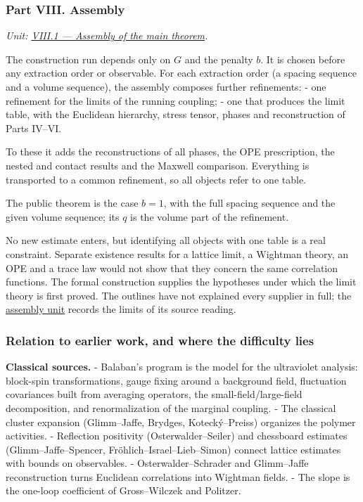 \documentclass[
  letterpaper,
  11pt]{article}
\begin{document}
\subsubsection{Part VIII. Assembly}\label{part-viii.-assembly}

\emph{Unit:
\href{https://github.com/scottnarmstrong/yang-mills-informalization/blob/main/outline/units/VIII-1.md}{VIII.1
--- Assembly of the main theorem}.}

The construction run depends only on \(G\) and the penalty \(b\). It is
chosen before any extraction order or observable. For each extraction
order (a spacing sequence and a volume sequence), the assembly composes
further refinements: - one refinement for the limits of the running
coupling; - one that produces the limit table, with the Euclidean
hierarchy, stress tensor, phases and reconstruction of Parts IV--VI.

To these it adds the reconstructions of all phases, the OPE
prescription, the nested and contact results and the Maxwell comparison.
Everything is transported to a common refinement, so all objects refer
to one table.

The public theorem is the case \(b=1\), with the full spacing sequence
and the given volume sequence; its \(q\) is the volume part of the
refinement.

No new estimate enters, but identifying all objects with one table is a
real constraint. Separate existence results for a lattice limit, a
Wightman theory, an OPE and a trace law would not show that they concern
the same correlation functions. The formal construction supplies the
hypotheses under which the limit theory is first proved. The outlines
have not explained every supplier in full; the
\href{https://github.com/scottnarmstrong/yang-mills-informalization/blob/main/outline/units/VIII-1.md\#7-what-remains-unexplained}{assembly
unit} records the limits of its source reading.

\subsubsection{Relation to earlier work, and where the difficulty
lies}\label{relation-to-earlier-work-and-where-the-difficulty-lies}

\textbf{Classical sources.} - Balaban's program is the model for the
ultraviolet analysis: block-spin transformations, gauge fixing around a
background field, fluctuation covariances built from averaging
operators, the small-field/large-field decomposition, and
renormalization of the marginal coupling. - The classical cluster
expansion (Glimm--Jaffe, Brydges, Kotecký--Preiss) organizes the polymer
activities. - Reflection positivity (Osterwalder--Seiler) and chessboard
estimates (Glimm--Jaffe--Spencer, Fröhlich--Israel--Lieb--Simon) connect
lattice estimates with bounds on observables. - Osterwalder--Schrader
and Glimm--Jaffe reconstruction turns Euclidean correlations into
Wightman fields. - The slope is the one-loop coefficient of
Gross--Wilczek and Politzer.
\end{document}
